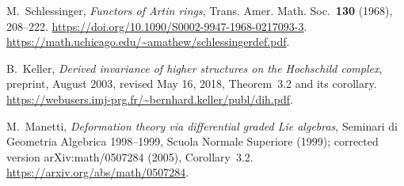 M.~Schlessinger, \emph{Functors of Artin rings},
Trans. Amer. Math. Soc.\ \textbf{130} (1968), 208--222.
\url{https://doi.org/10.1090/S0002-9947-1968-0217093-3}.
\url{https://math.uchicago.edu/~amathew/schlessingerdef.pdf}.

B.~Keller, \emph{Derived invariance of higher structures on the Hochschild complex},
preprint, August 2003, revised May 16, 2018, Theorem~3.2 and its corollary.
\url{https://webusers.imj-prg.fr/~bernhard.keller/publ/dih.pdf}.

M.~Manetti, \emph{Deformation theory via differential graded Lie algebras},
Seminari di Geometria Algebrica 1998--1999, Scuola Normale Superiore (1999);
corrected version arXiv:math/0507284 (2005), Corollary~3.2.
\url{https://arxiv.org/abs/math/0507284}.
